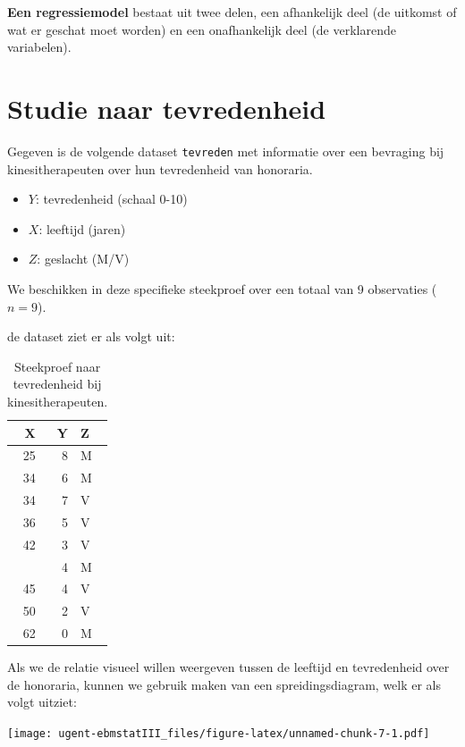 \documentclass[
]{book}
\providecommand{\tightlist}{%
  \setlength{\itemsep}{0pt}\setlength{\parskip}{0pt}}
\theoremstyle{definition}
\theoremstyle{definition}
\theoremstyle{definition}
\theoremstyle{definition}
\theoremstyle{remark}
\begin{document}
\textbf{Een regressiemodel} bestaat uit twee delen, een afhankelijk deel (de uitkomst of wat er geschat moet worden) en een onafhankelijk deel (de verklarende variabelen).

\hypertarget{studie-naar-tevredenheid-1}{%
\section*{Studie naar tevredenheid}\label{studie-naar-tevredenheid-1}}


Gegeven is de volgende dataset \texttt{tevreden} met informatie over een bevraging bij kinesitherapeuten over hun tevredenheid van honoraria.

\begin{itemize}
\tightlist
\item
  \(Y\): tevredenheid (schaal 0-10)
\item
  \(X\): leeftijd (jaren)
\item
  \(Z\): geslacht (M/V)
\end{itemize}

We beschikken in deze specifieke steekproef over een totaal van 9 observaties (\(n = 9\)).

de dataset ziet er als volgt uit:

\begin{table}

\caption{\label{tab:tevereden2}Steekproef naar tevredenheid bij kinesitherapeuten.}
\centering
\begin{tabular}[t]{rrl}
\toprule
X & Y & Z\\
\midrule
25 & 8 & M\\
34 & 6 & M\\
34 & 7 & V\\
36 & 5 & V\\
42 & 3 & V\\
\addlinespace
44 & 4 & M\\
45 & 4 & V\\
50 & 2 & V\\
62 & 0 & M\\
\bottomrule
\end{tabular}
\end{table}

Als we de relatie visueel willen weergeven tussen de leeftijd en tevredenheid over de honoraria, kunnen we gebruik maken van een spreidingsdiagram, welk er als volgt uitziet:

\texttt{[image: ugent-ebmstatIII\_files/figure-latex/unnamed-chunk-7-1.pdf]}
\end{document}
